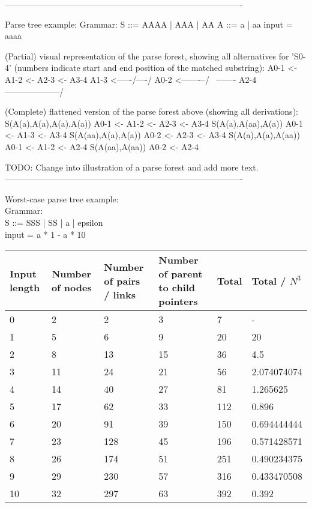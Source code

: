 \documentclass[a4paper,10pt]{article}
\begin{document}
-------------------------------------------------------------------------------------

Parse tree example:
Grammar:
S ::= AAAA | AAA | AA
A ::= a | aa
input = aaaa

(Partial) visual representation of the parse forest, showing all alternatives for 'S0-4' (numbers indicate start and end position of the matched substring):
A0-1 <- A1-2 <- A2-3 <- A3-4
 \- A1-3 <--\-----/----/
A0-2 <-------\---/
 \            \-------- A2-4
  \---------------------/

(Complete) flattened version of the parse forest above (showing all derivations):
S(A(a),A(a),A(a),A(a))	A0-1 <- A1-2 <- A2-3 <- A3-4
S(A(a),A(aa),A(a))	A0-1 <- A1-3 <- A3-4
S(A(aa),A(a),A(a))	A0-2 <- A2-3 <- A3-4
S(A(a),A(a),A(aa))	A0-1 <- A1-2 <- A2-4
S(A(aa),A(aa))		A0-2 <- A2-4

TODO: Change into illustration of a parse forest and add more text.\\

-------------------------------------------------------------------------------------

Worst-case parse tree example:\\

Grammar:\\
S ::= SSS | SS | a | epsilon\\
input = a * 1 - a * 10\\

\begin{tabular}{ | p{5em} | p{5em} | p{5em} | p{8em} | p{5em} | p{5em} |}
  \hline
  Input length & Number of nodes & Number of pairs / links & Number of parent to child pointers & Total & Total / $N^{3}$ \\
  \hline
  0 & 2 & 2 & 3 & 7 & - \\
  1 & 5 & 6 & 9 & 20 & 20 \\
  2 & 8 & 13 & 15 & 36 & 4.5 \\
  3 & 11 & 24 & 21 & 56 & 2.074074074 \\
  4 & 14 & 40 & 27 & 81 & 1.265625 \\
  5 & 17 & 62 & 33 & 112 & 0.896 \\
  6 & 20 & 91 & 39 & 150 & 0.694444444 \\
  7 & 23 & 128 & 45 & 196 & 0.571428571 \\
  8 & 26 & 174 & 51 & 251 & 0.490234375 \\
  9 & 29 & 230 & 57 & 316 & 0.433470508 \\
  10 & 32 & 297 & 63 & 392 & 0.392 \\
  \hline
\end{tabular}
\end{document}
